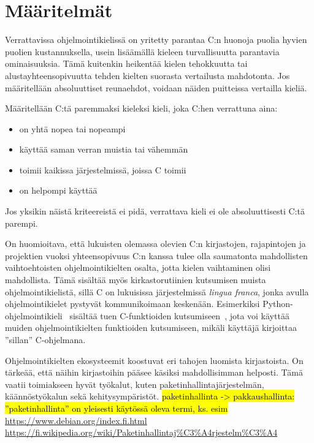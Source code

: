 \section{Määritelmät} 

Verrattavissa ohjelmointikielissä on yritetty parantaa C:n huonoja puolia
hyvien puolien kustannuksella, usein lisäämällä kieleen turvallisuutta
parantavia ominaisuuksia. Tämä kuitenkin heikentää kielen tehokkuutta tai
alustayhteensopivuutta tehden kielten suorasta vertailusta mahdotonta. Jos
määritellään absoluuttiset reunaehdot, voidaan näiden puitteissa vertailla
kieliä.

Määritellään C:tä paremmaksi kieleksi kieli, joka C:hen verrattuna aina:

\begin{itemize}
    \item on yhtä nopea tai nopeampi
    \item käyttää saman verran muistia tai vähemmän
    \item toimii kaikissa järjestelmissä, joissa C toimii
    \item on helpompi käyttää
\end{itemize}

Jos yksikin näistä kriteereistä ei pidä, verrattava kieli ei ole absoluuttisesti
C:tä parempi.

On huomioitava, että lukuisten olemassa olevien C:n kirjastojen, rajapintojen
ja projektien vuoksi yhteensopivuus C:n kanssa tulee olla saumatonta
mahdollisten vaihtoehtoisten ohjelmointikielten osalta, jotta kielen
vaihtaminen olisi mahdollista. Tämä sisältää myös kirkastorutiinien kutsumisen
muista ohjelmointikielistä, sillä C on lukuisissa järjestelmissä \emph{lingua
franca}, jonka avulla ohjelmointikielet pystyvät kommunikoimaan keskenään.
Esimerkiksi Python-ohjelmointikieli~\citep{python} sisältää tuen C-funktioiden
kutsumiseen~\citep{pythonffi}, jota voi käyttää muiden ohjelmointikielten
funktioiden kutsumiseen, mikäli käyttäjä kirjoittaa ''sillan'' C-ohjelmana.

Ohjelmointikielten ekosysteemit koostuvat eri tahojen luomista kirjastoista. On
tärkeää, että näihin kirjastoihin pääsee käsiksi mahdollisimman helposti. Tämä
vaatii toimiakseen hyvät työkalut, kuten
paketinhallintajärjestelmän, käännöstyökalun
sekä kehitysympäristöt. \hl{paketinhallinta -> pakkaushallinta:
''paketinhallinta'' on yleisesti käytössä oleva termi, ks. esim} \\
\url{https://www.debian.org/index.fi.html} \\
\url{https://fi.wikipedia.org/wiki/Paketinhallintaj\%C3\%A4rjestelm\%C3\%A4}

